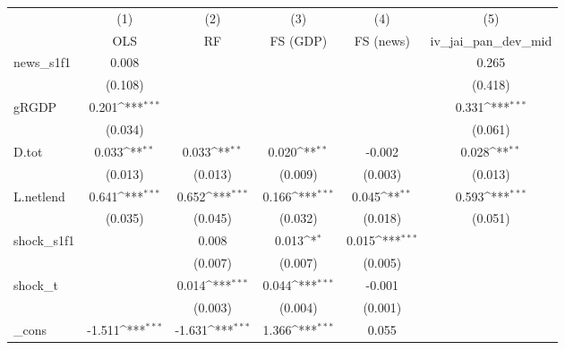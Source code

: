 {
\def\sym#1{\ifmmode^{#1}\else\(^{#1}\)\fi}
\begin{tabular}{l*{5}{c}}
\toprule
            &\multicolumn{1}{c}{(1)}&\multicolumn{1}{c}{(2)}&\multicolumn{1}{c}{(3)}&\multicolumn{1}{c}{(4)}&\multicolumn{1}{c}{(5)}\\
            &\multicolumn{1}{c}{OLS}&\multicolumn{1}{c}{RF}&\multicolumn{1}{c}{FS (GDP)}&\multicolumn{1}{c}{FS (news)}&\multicolumn{1}{c}{iv\_jai\_pan\_dev\_mid}\\
\midrule
news\_s1f1   &       0.008         &                     &                     &                     &       0.265         \\
            &     (0.108)         &                     &                     &                     &     (0.418)         \\
\addlinespace
gRGDP       &       0.201\sym{***}&                     &                     &                     &       0.331\sym{***}\\
            &     (0.034)         &                     &                     &                     &     (0.061)         \\
\addlinespace
D.tot       &       0.033\sym{**} &       0.033\sym{**} &       0.020\sym{**} &      -0.002         &       0.028\sym{**} \\
            &     (0.013)         &     (0.013)         &     (0.009)         &     (0.003)         &     (0.013)         \\
\addlinespace
L.netlend   &       0.641\sym{***}&       0.652\sym{***}&       0.166\sym{***}&       0.045\sym{**} &       0.593\sym{***}\\
            &     (0.035)         &     (0.045)         &     (0.032)         &     (0.018)         &     (0.051)         \\
\addlinespace
shock\_s1f1  &                     &       0.008         &       0.013\sym{*}  &       0.015\sym{***}&                     \\
            &                     &     (0.007)         &     (0.007)         &     (0.005)         &                     \\
\addlinespace
shock\_t     &                     &       0.014\sym{***}&       0.044\sym{***}&      -0.001         &                     \\
            &                     &     (0.003)         &     (0.004)         &     (0.001)         &                     \\
\addlinespace
\_cons      &      -1.511\sym{***}&      -1.631\sym{***}&       1.366\sym{***}&       0.055         &                     \\

\end{tabular}}

